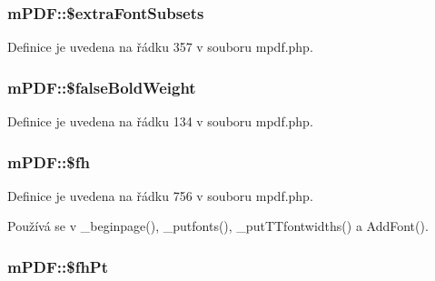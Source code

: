 \hypertarget{classm_p_d_f_a4e95e6e384234e11b16e3ea614509604}{
\subsubsection[{\$extra\-Font\-Subsets}]{\setlength{\rightskip}{0pt plus 5cm}m\-P\-D\-F\-::\$extra\-Font\-Subsets}}\label{classm_p_d_f_a4e95e6e384234e11b16e3ea614509604}


Definice je uvedena na řádku 357 v souboru mpdf.\-php.

\hypertarget{classm_p_d_f_a6816ddb557b7416e5a448564f6034e87}{
\subsubsection[{\$false\-Bold\-Weight}]{\setlength{\rightskip}{0pt plus 5cm}m\-P\-D\-F\-::\$false\-Bold\-Weight}}\label{classm_p_d_f_a6816ddb557b7416e5a448564f6034e87}


Definice je uvedena na řádku 134 v souboru mpdf.\-php.

\hypertarget{classm_p_d_f_a79fbe7491b99e8407ead32b17280c15e}{
\subsubsection[{\$fh}]{\setlength{\rightskip}{0pt plus 5cm}m\-P\-D\-F\-::\$fh}}\label{classm_p_d_f_a79fbe7491b99e8407ead32b17280c15e}


Definice je uvedena na řádku 756 v souboru mpdf.\-php.



Používá se v \-\_\-beginpage(), \-\_\-putfonts(), \-\_\-put\-T\-Tfontwidths() a Add\-Font().

\hypertarget{classm_p_d_f_ad70548479d1aae66d9274fb1bef341e3}{
\subsubsection[{\$fh\-Pt}]{\setlength{\rightskip}{0pt plus 5cm}m\-P\-D\-F\-::\$fh\-Pt}}\label{classm_p_d_f_ad70548479d1aae66d9274fb1bef341e3}


